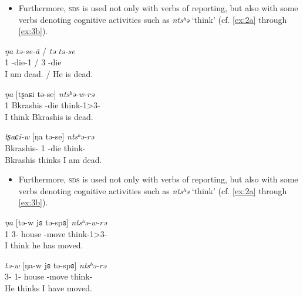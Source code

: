 \documentclass[11pt]{article}
\newcommand{\ipa}[1]{{\textit{\phon #1}}} %
\newcommand{\ipapl}[1]{{\phondroit #1}}
\begin{document}


\begin{itemize}

\item Furthermore, \textsc{sds} is used not only with verbs of reporting, but also with some verbs denoting cognitive activities such as \ipa{ntsʰə} `think' (cf. \ref{ex:2a} through \ref{ex:3b}).
\end{itemize}

\begin{exe}
\ex
\begin{xlist}
\ex \label{ex:2a}
\gll
	\ipa{ŋa} \ipa{tə-se-ã} / \ipa{tə} \ipa{tə-se}\\
	{1\sg}  {\prf-die-1} / {3\sg}  {\prf-die}\\ 
	\glt I am dead. / He is dead.

\ex \label{ex:2b}
\gll
	\ipa{ŋa} [\ipapl{tʂaɕi} \ipapl{tə-se}] \ipa{ntsʰə-w-rə}  \\
	{1\sg} {Bkrashis} {\prf-die} {think-1\sg>3-\const}\\ 
	\glt I think Bkrashis is dead.

\ex \label{ex:2c}
\gll
	\ipa{tʂaɕi-w} [\ipapl{ŋa} \ipapl{tə-se}] \ipa{ntsʰə-rə}  \\
	{Bkrashis-\erg} {1\sg} {\prf-die} {think-\const}\\ 
	\glt Bkrashis thinks I am dead.


\end{xlist}
\end{exe}


\begin{itemize}

\item Furthermore, \textsc{sds} is used not only with verbs of reporting, but also with some verbs denoting cognitive activities such as \ipa{ntsʰə} `think' (cf. \ref{ex:2a} through \ref{ex:3b}).
\end{itemize}

\begin{exe}
\ex
\begin{xlist}
\ex \label{ex:3a}
\gll
	\ipa{ŋa} [\ipapl{tə-w}	 \ipapl{jɞ} \ipapl{tə-spɞ}] \ipa{ntsʰə-w-rə}  \\
	 {1\sg} {3\sg-\erg} house {\prf-move} {think-1\sg>3-\const}\\ 
	\glt I think he has moved.

\ex \label{ex:3b}
\gll
	 \ipa{tə-w} [\ipapl{ŋa-w} \ipapl{jɞ} \ipapl{tə-spɞ}] \ipa{ntsʰə-rə}  \\
	  {3\sg-\erg} {1\sg-\erg} house {\prf-move} {think-\const}\\ 
	\glt He thinks I have moved.
\end{xlist}
\end{exe}
\end{document}
